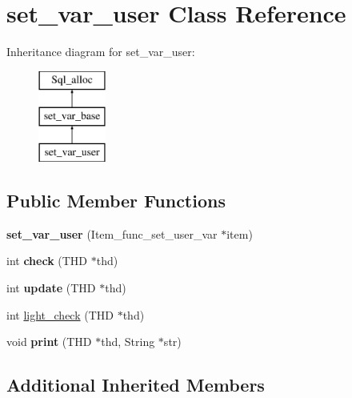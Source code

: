 \hypertarget{classset__var__user}{}\section{set\+\_\+var\+\_\+user Class Reference}
\label{classset__var__user}
Inheritance diagram for set\+\_\+var\+\_\+user\+:\begin{figure}[H]
\begin{center}
\leavevmode
\includegraphics[height=3.000000cm]{classset__var__user}
\end{center}
\end{figure}
\subsection*{Public Member Functions}
\begin{DoxyCompactItemize}
\item 
\mbox{\label{classset__var__user_a5f4de921b0f43f74d03bec323c815814}} 
{\bfseries set\+\_\+var\+\_\+user} (Item\+\_\+func\+\_\+set\+\_\+user\+\_\+var $\ast$item)
\item 
\mbox{\label{classset__var__user_a766e2a6e7430fa2dff88d7b7e7b29a06}} 
int {\bfseries check} (T\+HD $\ast$thd)
\item 
\mbox{\label{classset__var__user_a1aba84e1300c53f92ce800041131d803}} 
int {\bfseries update} (T\+HD $\ast$thd)
\item 
int \mbox{\hyperlink{classset__var__user_a5769b3f045a26806a8facc721c66e2c7}{light\+\_\+check}} (T\+HD $\ast$thd)
\item 
\mbox{\label{classset__var__user_aca49425c94c183f3e09330d1e1660d80}} 
void {\bfseries print} (T\+HD $\ast$thd, String $\ast$str)
\end{DoxyCompactItemize}
\subsection*{Additional Inherited Members}


